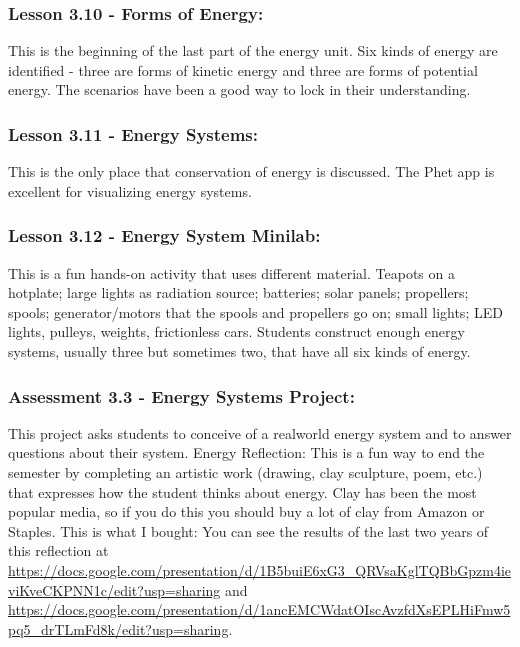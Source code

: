 \documentclass[11pt]{article}
\begin{document}
\subsubsection{Lesson 3.10 - Forms of Energy:}
\label{sec:org52b5cee}

This is the beginning of the last part of the energy unit. Six kinds of energy are identified - three are forms of kinetic energy and three are forms
of potential energy. The scenarios have been a good way to lock in their understanding.


\subsubsection{Lesson 3.11 - Energy Systems:}
\label{sec:orgbfabef7}

This is the only place that conservation of energy is
discussed. The Phet app is excellent for visualizing energy systems.


\subsubsection{Lesson 3.12 - Energy System Minilab:}
\label{sec:orgbcc90bf}

This is a fun hands-on activity that uses different
material. Teapots on a hotplate; large lights as radiation source; batteries; solar panels;
propellers; spools; generator/motors that the spools and propellers go on; small lights;
LED lights, pulleys, weights, frictionless cars. Students construct enough energy
systems, usually three but sometimes two, that have all six kinds of energy.


\subsubsection{Assessment 3.3 - Energy Systems Project:}
\label{sec:org982d82b}

This project asks students to conceive of a realworld energy system and to answer questions about their system.
Energy Reflection: This is a fun way to end the semester by completing an artistic work
(drawing, clay sculpture, poem, etc.) that expresses how the student thinks about energy. Clay
has been the most popular media, so if you do this you should buy a lot of clay from Amazon or
Staples. This is what I bought:
You can see the results of the last two years of this reflection at
\url{https://docs.google.com/presentation/d/1B5buiE6xG3\_QRVsaKglTQBbGpzm4ieviKveCKPNN1c/edit?usp=sharing} and
\url{https://docs.google.com/presentation/d/1ancEMCWdatOIscAvzfdXsEPLHiFmw5pq5\_drTLmFd8k/edit?usp=sharing}.
\end{document}
